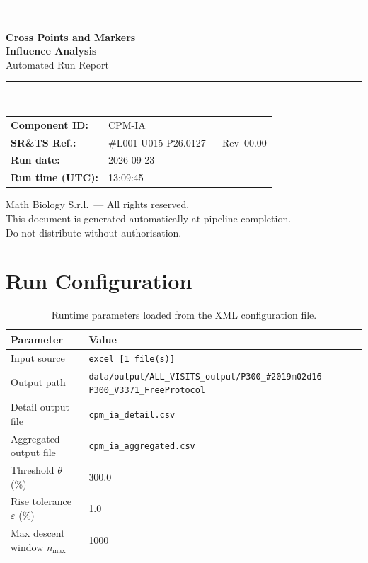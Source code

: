 \documentclass[a4paper,11pt]{article}
\begin{document}
\begin{titlepage}
\begin{center}
  \vspace*{1.8cm}
  {\color{dmaaccent}\rule{\linewidth}{1.5pt}}\\[0.6cm]
  {\LARGE\bfseries\color{dmaaccent}
    Cross Points and Markers\\[0.25cm]
    Influence Analysis}\\[0.4cm]
  {\Large Automated Run Report}\\[0.3cm]
  {\color{dmaaccent}\rule{\linewidth}{1.5pt}}\\[2cm]

  \begin{tabular}{ll}
    \textbf{Component ID:}   & CPM-IA \\[0.3cm]
    \textbf{SR\&TS Ref.:}    & \#L001-U015-P26.0127 --- Rev~00.00 \\[0.3cm]
    \textbf{Run date:}       & 2026-09-23 \\[0.3cm]
    \textbf{Run time (UTC):} & 13:09:45 \\
  \end{tabular}

  \vfill
  {\color{dmagray}\small
    Math Biology S.r.l.\ --- All rights reserved.\\
    This document is generated automatically at pipeline completion.\\
    Do not distribute without authorisation.}
\end{center}
\end{titlepage}

\tableofcontents
\clearpage

\section{Run Configuration}

\begin{table}[h!]
\centering
\small
\caption{Runtime parameters loaded from the XML configuration file.}
\begin{tabular}{ll}
\toprule
\textbf{Parameter} & \textbf{Value} \\
\midrule
Input source                      & \texttt{excel [1 file(s)]} \\
Output path                       & \texttt{data/output/ALL\_VISITS\_output/P300\_\#2019m02d16-P300\_V3371\_FreeProtocol} \\
Detail output file                & \texttt{cpm\_ia\_detail.csv} \\
Aggregated output file            & \texttt{cpm\_ia\_aggregated.csv} \\
Threshold $\theta$ (\%)           & 300.0 \\
Rise tolerance $\varepsilon$ (\%) & 1.0 \\
Max descent window $n_{\max}$     & 1000 \\
\bottomrule
\end{tabular}
\end{table}
\end{document}
